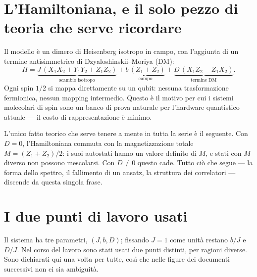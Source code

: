 \documentclass[11pt,a4paper]{article}
\begin{document}

\FloatBarrier

\section{L'Hamiltoniana, e il solo pezzo di teoria che serve ricordare}

Il modello è un dimero di Heisenberg isotropo in campo, con l'aggiunta di un
termine antisimmetrico di Dzyaloshinskii--Moriya (DM):
\begin{equation}
H = \underbrace{J\,(X_1X_2+Y_1Y_2+Z_1Z_2)}_{\text{scambio isotropo}}
  + \underbrace{b\,(Z_1+Z_2)}_{\text{campo}}
  + \underbrace{D\,(X_1Z_2-Z_1X_2)}_{\text{termine DM}}.
\label{eq:H}
\end{equation}
Ogni spin $1/2$ si mappa direttamente su un qubit: nessuna trasformazione
fermionica, nessun mapping intermedio. Questo è il motivo per cui i sistemi
molecolari di spin sono un banco di prova naturale per l'hardware quantistico
attuale --- il costo di rappresentazione è minimo.

L'unico fatto teorico che serve tenere a mente in tutta la serie è il seguente.
Con $D=0$, l'Hamiltoniana commuta con la magnetizzazione totale
$M=(Z_1+Z_2)/2$: i suoi autostati hanno un valore definito di $M$, e stati con
$M$ diverso non possono mescolarsi. Con $D\neq0$ questo cade. Tutto ciò che
segue --- la forma dello spettro, il fallimento di un ansatz, la struttura dei
correlatori --- discende da questa singola frase.


\section{I due punti di lavoro usati}

Il sistema ha tre parametri, $(J,b,D)$; fissando $J=1$ come unità restano
$b/J$ e $D/J$. Nel corso del lavoro sono stati usati due punti distinti, per
ragioni diverse. Sono dichiarati qui una volta per tutte, così che nelle figure
dei documenti successivi non ci sia ambiguità.
\end{document}
